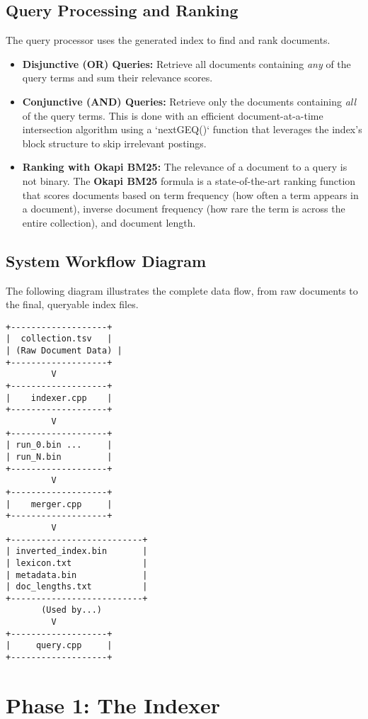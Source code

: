 \documentclass{article}
\begin{document}
\subsection{Query Processing and Ranking}
The query processor uses the generated index to find and rank documents.
\begin{itemize}
    \item \textbf{Disjunctive (OR) Queries:} Retrieve all documents containing \textit{any} of the query terms and sum their relevance scores.
    \item \textbf{Conjunctive (AND) Queries:} Retrieve only the documents containing \textit{all} of the query terms. This is done with an efficient document-at-a-time intersection algorithm using a `nextGEQ()` function that leverages the index's block structure to skip irrelevant postings.
    \item \textbf{Ranking with Okapi BM25:} The relevance of a document to a query is not binary. The \textbf{Okapi BM25} formula is a state-of-the-art ranking function that scores documents based on term frequency (how often a term appears in a document), inverse document frequency (how rare the term is across the entire collection), and document length.
\end{itemize}

\subsection{System Workflow Diagram}
The following diagram illustrates the complete data flow, from raw documents to the final, queryable index files.
\begin{verbatim}
+-------------------+
|  collection.tsv   |
| (Raw Document Data) |
+-------------------+
         V
+-------------------+
|    indexer.cpp    |
+-------------------+
         V
+-------------------+
| run_0.bin ...     |
| run_N.bin         |
+-------------------+
         V
+-------------------+
|    merger.cpp     |
+-------------------+
         V
+--------------------------+
| inverted_index.bin       |
| lexicon.txt              |
| metadata.bin             |
| doc_lengths.txt          |
+--------------------------+
       (Used by...)
         V
+-------------------+
|     query.cpp     |
+-------------------+
\end{verbatim}


\section{Phase 1: The Indexer}
\end{document}
